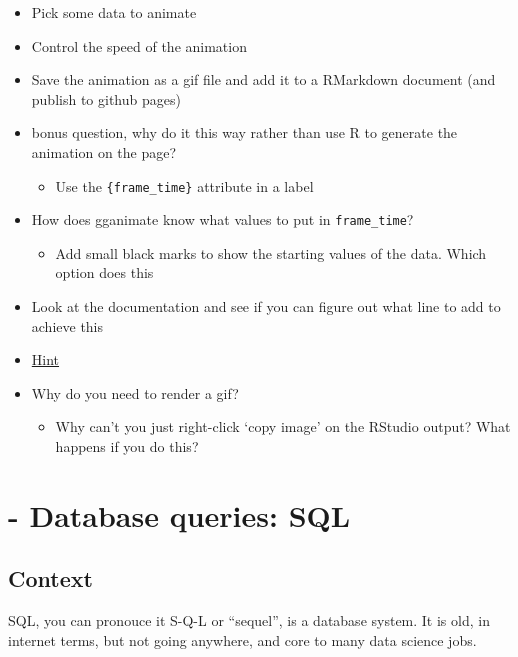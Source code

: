 \documentclass[
]{book}
\providecommand{\tightlist}{%
  \setlength{\itemsep}{0pt}\setlength{\parskip}{0pt}}
\begin{document}
\begin{itemize}
\tightlist
\item
  Pick some data to animate
\item
  Control the speed of the animation
\item
  Save the animation as a gif file and add it to a RMarkdown document (and publish to github pages)
\item
  bonus question, why do it this way rather than use R to generate the animation on the page?

  \begin{itemize}
  \tightlist
  \item
    Use the \texttt{\{frame\_time\}} attribute in a label
  \end{itemize}
\item
  How does gganimate know what values to put in \texttt{frame\_time}?

  \begin{itemize}
  \tightlist
  \item
    Add small black marks to show the starting values of the data. Which option does this
  \end{itemize}
\item
  Look at the documentation and see if you can figure out what line to add to achieve this
\item
  \href{https://gganimate.com/reference/shadow_mark.html}{Hint}
\item
  Why do you need to render a gif?

  \begin{itemize}
  \tightlist
  \item
    Why can't you just right-click `copy image' on the RStudio output? What happens if you do this?
  \end{itemize}
\end{itemize}

\hypertarget{database-queries-sql}{%
\chapter*{- Database queries: SQL}\label{database-queries-sql}}


\hypertarget{context}{%
\section{Context}\label{context}}

SQL, you can pronouce it S-Q-L or ``sequel'', is a database system. It is old, in internet terms, but not going anywhere, and core to many data science jobs.
\end{document}
